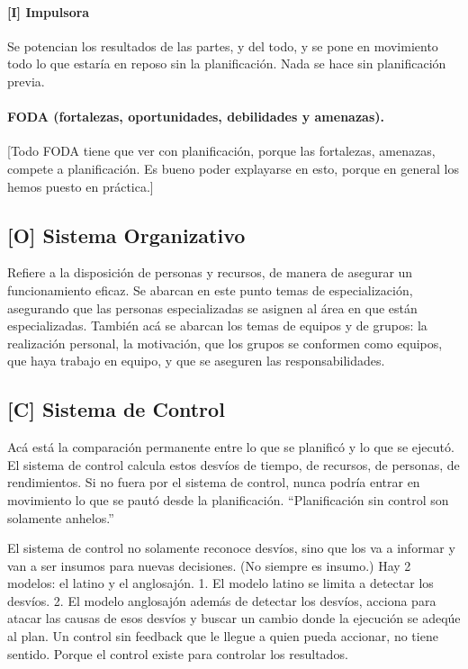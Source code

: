 \hypertarget{impulsora}{%
\paragraph{{[}I{]} Impulsora}\label{impulsora}}
Se potencian los resultados de las
partes, y del todo, y se pone en movimiento todo lo que estaría en
reposo sin la planificación. Nada se hace sin planificación previa.

\paragraph*{FODA (fortalezas, oportunidades, debilidades y amenazas).} [Todo FODA tiene que ver con planificación, porque las
fortalezas, amenazas, compete a planificación. Es bueno poder explayarse
en esto, porque en general los hemos puesto en práctica.]

\hypertarget{sistema-organizativo}{%
\subsection{{[}O{]} Sistema Organizativo}\label{sistema-organizativo}}

Refiere a la disposición de personas y recursos, de manera de asegurar
un funcionamiento eficaz. Se abarcan en este punto temas de
especialización, asegurando que las personas especializadas se asignen
al área en que están especializadas. También acá se abarcan los temas de
equipos y de grupos: la realización personal, la motivación, que los
grupos se conformen como equipos, que haya trabajo en equipo, y que se
aseguren las responsabilidades.

\hypertarget{sistema-de-control}{%
\subsection{{[}C{]} Sistema de Control}\label{sistema-de-control}}

Acá está la comparación permanente entre lo que se planificó y lo que se
ejecutó. El sistema de control calcula estos desvíos de tiempo, de
recursos, de personas, de rendimientos. Si no fuera por el sistema de
control, nunca podría entrar en movimiento lo que se pautó desde la
planificación. ``Planificación sin control son solamente anhelos.''

El sistema de control no solamente reconoce desvíos, sino que los va a
informar y van a ser insumos para nuevas decisiones. (No siempre es
insumo.) Hay 2 modelos: el latino y el anglosajón. 1. El modelo latino se
limita a detectar los desvíos. 2. El modelo anglosajón además de detectar los desvíos, acciona para atacar
las causas de esos desvíos y buscar un cambio donde la ejecución se
adeqúe al plan. Un control sin feedback que le llegue a quien pueda
accionar, no tiene sentido. Porque el control existe para controlar los
resultados.

